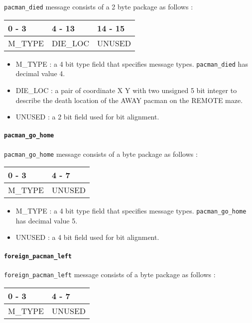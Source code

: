 \documentclass[]{article}
\let\oldparagraph\paragraph
\renewcommand{\paragraph}[1]{\oldparagraph{#1}\mbox{}}
\begin{document}
\texttt{pacman\_died} message consists of a 2 byte package as follows :

\begin{longtable}[]{@{}lll@{}}
\toprule
0 - 3 & 4 - 13 & 14 - 15\tabularnewline
\midrule
\endhead
M\_TYPE & DIE\_LOC & UNUSED\tabularnewline
\bottomrule
\end{longtable}

\begin{itemize}
\item
  M\_TYPE : a 4 bit type field that specifies message types.
  \texttt{pacman\_died} has decimal value 4.
\item
  DIE\_LOC : a pair of coordinate X Y with two unsigned 5 bit integer to
  describe the death location of the AWAY pacman on the REMOTE maze.
\item
  UNUSED : a 2 bit field used for bit alignment.
\end{itemize}

\hypertarget{pacman_go_home}{%
\paragraph{\texorpdfstring{\texttt{pacman\_go\_home}}{pacman\_go\_home}}\label{pacman_go_home}}

\texttt{pacman\_go\_home} message consists of a byte package as follows
:

\begin{longtable}[]{@{}ll@{}}
\toprule
0 - 3 & 4 - 7\tabularnewline
\midrule
\endhead
M\_TYPE & UNUSED\tabularnewline
\bottomrule
\end{longtable}

\begin{itemize}
\item
  M\_TYPE : a 4 bit type field that specifies message types.
  \texttt{pacman\_go\_home} has decimal value 5.
\item
  UNUSED : a 4 bit field used for bit alignment.
\end{itemize}

\hypertarget{foreign_pacman_left}{%
\paragraph{\texorpdfstring{\texttt{foreign\_pacman\_left}}{foreign\_pacman\_left}}\label{foreign_pacman_left}}

\texttt{foreign\_pacman\_left} message consists of a byte package as
follows :

\begin{longtable}[]{@{}ll@{}}
\toprule
0 - 3 & 4 - 7\tabularnewline
\midrule
\endhead
M\_TYPE & UNUSED\tabularnewline
\bottomrule
\end{longtable}
\end{document}
